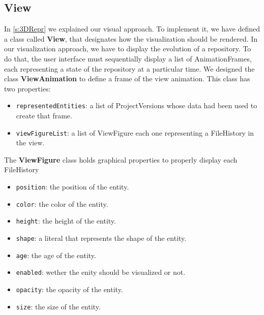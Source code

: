 \subsection*{View}
\label{s:view_impl}
In \autoref{s:3DRepr} we explained our visual approach. To implement it, we have defined a class called \textbf{View}, that designates how the visualization should be rendered. 
In our visualization approach, we have to display the evolution of a repository. To do that, the user interface must sequentially display a list of AnimationFrames, each representing a state of the repository at a particular time. We designed the class \textbf{ViewAnimation} to define a frame of the view animation. This class has two properties:
\begin{itemize}
    \item \texttt{representedEntities}: a list of ProjectVersions whose data had been used to create that frame.
    \item \texttt{viewFigureList}: a list of ViewFigure each one representing a FileHistory in the view.
\end{itemize}

The \textbf{ViewFigure} class holds graphical properties to properly display each FileHistory
\begin{itemize}
    \item \texttt{position}: the position of the entity.
    \item \texttt{color}: the color of the entity.
    \item \texttt{height}: the height of the entity.
    \item \texttt{shape}: a literal that represents the shape of the entity. 
    \item \texttt{age}: the age of the entity.
    \item \texttt{enabled}: wether the enity should be visualized or not.
    \item \texttt{opacity}: the opacity of the entity.
    \item \texttt{size}: the size of the entity.
\end{itemize}

